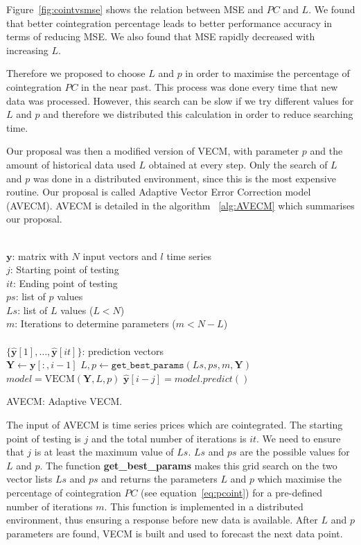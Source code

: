 Figure~\ref{fig:cointvsmse} shows the relation between MSE and $PC$ and $L$.
We found that better cointegration percentage leads to better
performance accuracy in terms of reducing MSE. We also found that MSE rapidly decreased with increasing $L$.

Therefore we proposed to choose $L$ and $p$ in order to maximise the percentage of
cointegration $PC$ in the near past. This process was done every time that new data was processed. However, this search can be slow if we try different values for $L$ and $p$ and therefore we distributed this calculation in order to reduce searching time.

Our proposal was then a modified version of VECM, with parameter $p$ and the amount of historical data used $L$ obtained at every step. Only the search of $L$ and $p$ was done in a distributed environment, since this is the most expensive routine. Our proposal is called Adaptive Vector Error Correction model (AVECM).
AVECM is detailed in the algorithm ~\ref{alg:AVECM} which summarises our proposal. 

\begin{algorithm}[ht!]
\begin{algorithmic}[1]
\REQUIRE $\,$ \\
$\mathbf{y}$: matrix with $N$ input vectors and $l$ time series\\
$j$: Starting point of testing \\
$it$: Ending point of testing \\
$ps$: list of $p$ values \\
$Ls$: list of $L$ values ($L<N$) \\
$m$: Iterations to determine parameters ($m < N-L$)\\
\ENSURE  $\,$ \\
$\{ \hat{\mathbf{y}}[1],\dots,\hat{\mathbf{y}}[it]\}$: prediction vectors \\
   \STATE $\mathbf{Y} \gets \mathbf{y}[:,i-1]$
    \STATE $L,p \gets
    \texttt{get\_best\_params}(Ls,ps,m,\mathbf{Y})$
        \STATE $model = \text{VECM}(\mathbf{Y},L, p)$
        \STATE $\hat{\mathbf{y}}[i-j] = model.predict()$
\ENDFOR
\end{algorithmic}
\caption{AVECM: Adaptive VECM.}
\label{alg:AVECM}
\end{algorithm}

The input of AVECM is time series prices which are cointegrated. The starting point of testing is $j$ and the total number of iterations is $it$. We need to ensure that $j$ is at least the maximum value of $Ls$. $Ls$ and $ps$ are the possible values for $L$ and $p$.
The function {\bf get\_best\_params} makes this grid search on the two vector
lists $Ls$ and $ps$ and returns the parameters $L$ and $p$ which maximise
the percentage of cointegration $PC$ (see equation~\ref{eq:pcoint}) for a
pre-defined number of iterations $m$. This function is implemented in a distributed 
environment, thus ensuring a response
before new data is available. 
After $L$ and $p$ parameters are found, VECM is built and used
to forecast the next data point.


